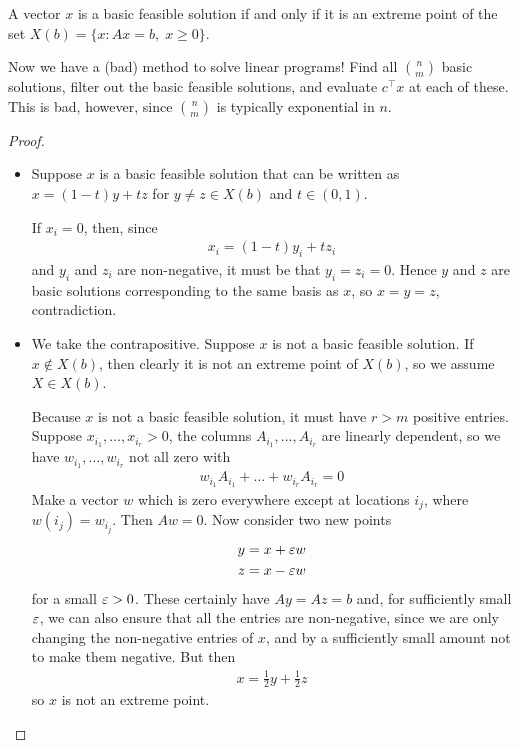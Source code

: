 \documentclass{../template/note}
\begin{document}
    \begin{theorem}
        A vector $x$ is a basic feasible solution if and only if it is an extreme point of the set $X(b) = \{x: Ax = b, \; x \geq 0\}$.
    \end{theorem}
    
    \begin{remark*}
        Now we have a (bad) method to solve linear programs! Find all $\binom n m$ basic solutions, filter out the basic feasible solutions, and evaluate $c^\intercal x$ at each of these. This is bad, however, since $\binom n m$ is typically exponential in $n$.
    \end{remark*}

    \begin{proof}
        \begin{itemize}
            \item[$\implies$] Suppose $x$ is a basic feasible solution that can be written as $x = (1-t)y+tz$ for $y \neq z \in X(b)$ and $t \in (0, 1)$.

            If $x_i = 0$, then, since
            \begin{align*}
                x_i = (1-t)y_i + tz_i
            \end{align*}
            and $y_i$ and $z_i$ are non-negative, it must be that $y_i = z_i = 0$. Hence $y$ and $z$ are basic solutions corresponding to the same basis as $x$, so $x=y=z$, contradiction.
            \item[$\impliedby$] We take the contrapositive. Suppose $x$ is not a basic feasible solution. If $x \notin X(b)$, then clearly it is not an extreme point of $X(b)$, so we assume $X \in X(b)$.
            
            Because $x$ is not a basic feasible solution, it must have $r > m$ positive entries. Suppose $x_{i_1}, \dots, x_{i_r} > 0$, the columns $A_{i_1}, \dots, A_{i_r}$ are linearly dependent, so we have $w_{i_1}, \dots, w_{i_r}$ not all zero with
            \begin{align*}
                w_{i_1}A_{i_1} + \dots + w_{i_r}A_{i_r} = 0
            \end{align*}
            Make a vector $w$ which is zero everywhere except at locations $i_j$, where $w(i_j) = w_{i_j}$. Then $Aw = 0$. Now consider two new points
            \begin{align*}
                y &= x + \varepsilon w \\
                z &= x - \varepsilon w
            \end{align*}
            for a small $\varepsilon > 0$. These certainly have $Ay = Az = b$ and, for sufficiently small $\varepsilon$, we can also ensure that all the entries are non-negative, since we are only changing the non-negative entries of $x$, and by a sufficiently small amount not to make them negative. But then
            \begin{align*}
                x = \frac 1 2 y + \frac 1 2 z
            \end{align*}
            so $x$ is not an extreme point.            
        \end{itemize}
    \end{proof}
    
\end{document}
